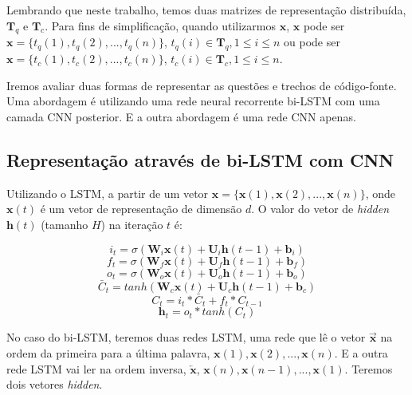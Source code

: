 Lembrando que neste trabalho, temos duas matrizes de representação distribuída, $\bm{T}_{q}$ e $\bm{T}_{c}$. Para fins de simplificação, quando utilizarmos $\bm{x}$, $\bm{x}$ pode ser $\bm{x} = \{ t_{q}(1), t_{q}(2), . . ., t_{q}(n)\}$, $t_{q}(i) \in \bm{T}_{q}, 1 \leq i \leq n$ ou pode ser $\bm{x} = \{ t_{c}(1), t_{c}(2), . . ., t_{c}(n)\}$, $t_{c}(i) \in \bm{T}_{c}, 1 \leq i \leq n$.


Iremos avaliar duas formas de representar as questões e trechos de código-fonte. Uma abordagem é utilizando uma rede neural recorrente bi-LSTM com uma camada CNN posterior. E a outra abordagem é uma rede CNN apenas.

\subsection{Representação através de bi-LSTM com CNN}

Utilizando o LSTM, a partir de um vetor $\bm{x} = \{ \bm{x}(1), \bm{x}(2), . . ., \bm{x}(n) \}$, onde $\bm{x}(t)$ é um vetor de representação de dimensão $d$. O valor do vetor de \textit{hidden} $\bm{h}(t)$ (tamanho $H$) na iteração $t$ é:

\begin{equation}
    i_{t} = \sigma(\bm{W}_{i}\bm{x}(t) + \bm{U}_{i}\bm{h}(t - 1) + \bm{b}_{i})
\end{equation}
\begin{equation}
    f_{t} = \sigma(\bm{W}_{f}\bm{x}(t) + \bm{U}_{f}\bm{h}(t - 1) + \bm{b}_{f})
\end{equation}
\begin{equation}
    o_{t} = \sigma(\bm{W}_{o}\bm{x}(t) + \bm{U}_{o}\bm{h}(t - 1) + \bm{b}_{o})
\end{equation}
\begin{equation}
    \bar{C}_{t} = tanh(\bm{W}_{c}\bm{x}(t) + \bm{U}_{c}\bm{h}(t - 1) + \bm{b}_{c})
\end{equation}
\begin{equation}
    C_{t} = i_{t} * \bar{C}_t + f_{t} * C_{t - 1}
\end{equation}
\begin{equation}
    \bm{h}_{t} = o_{t} * tanh(C_{t})
\end{equation}

No caso do bi-LSTM, teremos duas redes LSTM, uma rede que lê o vetor $\overrightarrow{\bm{x}}$ na ordem da primeira para a última palavra, $\bm{x}(1), \bm{x}(2), . . ., \bm{x}(n)$. E a outra rede LSTM vai ler na ordem inversa, $\overleftarrow{\bm{x}}$, $\bm{x}(n), \bm{x}(n - 1), . . ., \bm{x}(1)$. Teremos dois vetores \textit{hidden}.

